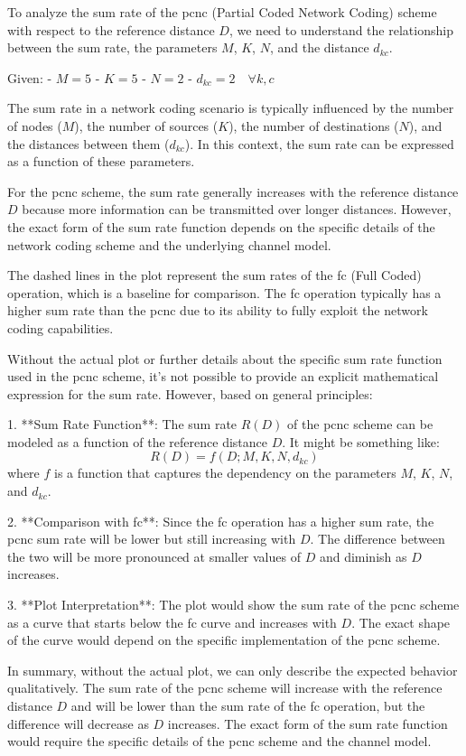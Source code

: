 To analyze the sum rate of the \gls{pcnc} (Partial Coded Network Coding) scheme with respect to the reference distance \( D \), we need to understand the relationship between the sum rate, the parameters \( M \), \( K \), \( N \), and the distance \( d_{kc} \).

Given:
- \( M = 5 \)
- \( K = 5 \)
- \( N = 2 \)
- \( d_{kc} = 2 \quad \forall k, c \)

The sum rate in a network coding scenario is typically influenced by the number of nodes (\( M \)), the number of sources (\( K \)), the number of destinations (\( N \)), and the distances between them (\( d_{kc} \)). In this context, the sum rate can be expressed as a function of these parameters.

For the \gls{pcnc} scheme, the sum rate generally increases with the reference distance \( D \) because more information can be transmitted over longer distances. However, the exact form of the sum rate function depends on the specific details of the network coding scheme and the underlying channel model.

The dashed lines in the plot represent the sum rates of the \gls{fc} (Full Coded) operation, which is a baseline for comparison. The \gls{fc} operation typically has a higher sum rate than the \gls{pcnc} due to its ability to fully exploit the network coding capabilities.

Without the actual plot or further details about the specific sum rate function used in the \gls{pcnc} scheme, it's not possible to provide an explicit mathematical expression for the sum rate. However, based on general principles:

1. **Sum Rate Function**: The sum rate \( R(D) \) of the \gls{pcnc} scheme can be modeled as a function of the reference distance \( D \). It might be something like:
   \[
   R(D) = f(D; M, K, N, d_{kc})
   \]
   where \( f \) is a function that captures the dependency on the parameters \( M \), \( K \), \( N \), and \( d_{kc} \).

2. **Comparison with \gls{fc}**: Since the \gls{fc} operation has a higher sum rate, the \gls{pcnc} sum rate will be lower but still increasing with \( D \). The difference between the two will be more pronounced at smaller values of \( D \) and diminish as \( D \) increases.

3. **Plot Interpretation**: The plot would show the sum rate of the \gls{pcnc} scheme as a curve that starts below the \gls{fc} curve and increases with \( D \). The exact shape of the curve would depend on the specific implementation of the \gls{pcnc} scheme.

In summary, without the actual plot, we can only describe the expected behavior qualitatively. The sum rate of the \gls{pcnc} scheme will increase with the reference distance \( D \) and will be lower than the sum rate of the \gls{fc} operation, but the difference will decrease as \( D \) increases. The exact form of the sum rate function would require the specific details of the \gls{pcnc} scheme and the channel model.